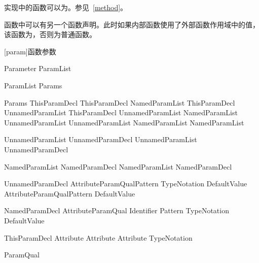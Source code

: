 \pnum
实现中的函数可以为。参见~\ref{method}。

\pnum
函数中可以有另一个函数声明。此时如果内部函数使用了外部函数作用域中的值，该函数为，否则为普通函数。

[param]{函数参数}

\begin{bnf}{Parameter}
    \terminal{(} ParamList\bnfq \terminal{)}
\end{bnf}

\begin{bnf}{ParamList}
    Params \terminal{,}\bnfq
\end{bnf}

\begin{bnf}{Params}
    ThisParamDecl \br
    ThisParamDecl \terminal{,} NamedParamList \br
    ThisParamDecl \terminal{,} UnnamedParamList \br
    ThisParamDecl \terminal{,} UnnamedParamList \terminal{,} NamedParamList \br
    UnnamedParamList \br
    UnnamedParamList \terminal{,} NamedParamList \br
    NamedParamList
\end{bnf}

\begin{bnf}{UnnamedParamList}
    UnnamedParamDecl \br
    UnnamedParamList \terminal{,} UnnamedParamDecl
\end{bnf}

\begin{bnf}{NamedParamList}
    NamedParamDecl \br
    NamedParamList \terminal{,} NamedParamDecl
\end{bnf}

\begin{bnf}{UnnamedParamDecl}
    Attribute\bnfs ParamQual\bnfq Pattern TypeNotation DefaultValue\bnfq \br
    Attribute\bnfs ParamQual\bnfq Pattern DefaultValue
\end{bnf}

\begin{bnf}{NamedParamDecl}
    Attribute\bnfs ParamQual\bnfs \terminal{(} Identifier \terminal{)} Pattern TypeNotation DefaultValue\bnfq
\end{bnf}

\begin{bnf}{ThisParamDecl}
    Attribute\bnfs {}\bnfq {} \br
    Attribute\bnfs \terminal{\&} \bnfq {} \br
    Attribute\bnfs {} TypeNotation
\end{bnf}

\begin{bnf}{ParamQual}
     \br
     \br
\end{bnf}

